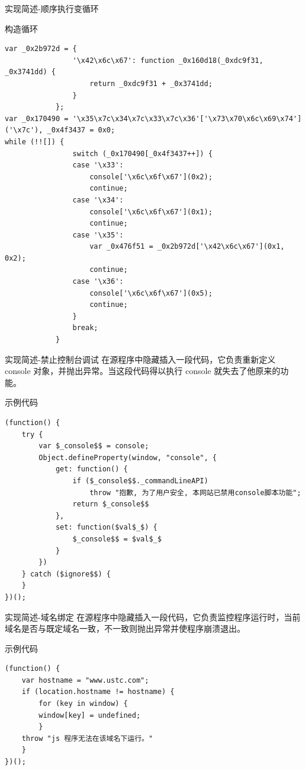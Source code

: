 \documentclass[presentation]{beamer}
\begin{document}
\begin{frame}[fragile,label=sec-17]{实现简述-顺序执行变循环}

\begin{block}{构造循环}
\begin{verbatim}
var _0x2b972d = {
                '\x42\x6c\x67': function _0x160d18(_0xdc9f31, _0x3741dd) {
                    return _0xdc9f31 + _0x3741dd;
                }
            };
var _0x170490 = '\x35\x7c\x34\x7c\x33\x7c\x36'['\x73\x70\x6c\x69\x74']('\x7c'), _0x4f3437 = 0x0;
while (!![]) {
                switch (_0x170490[_0x4f3437++]) {
                case '\x33':
                    console['\x6c\x6f\x67'](0x2);
                    continue;
                case '\x34':
                    console['\x6c\x6f\x67'](0x1);
                    continue;
                case '\x35':
                    var _0x476f51 = _0x2b972d['\x42\x6c\x67'](0x1, 0x2);
                    continue;
                case '\x36':
                    console['\x6c\x6f\x67'](0x5);
                    continue;
                }
                break;
            }
            \end{verbatim}
\end{block}
\end{frame}
\begin{frame}[fragile,label=sec-18]{实现简述-禁止控制台调试}
在源程序中隐藏插入一段代码，它负责重新定义 console 对象，并抛出异常。当这段代码得以执行 console 就失去了他原来的功能。
\begin{block}{示例代码}
\begin{verbatim}
(function() {  
    try {  
        var $_console$$ = console;  
        Object.defineProperty(window, "console", {  
            get: function() {  
                if ($_console$$._commandLineAPI)  
                    throw "抱歉, 为了用户安全, 本网站已禁用console脚本功能";  
                return $_console$$  
            },  
            set: function($val$_$) {  
                $_console$$ = $val$_$  
            }  
        })  
    } catch ($ignore$$) {  
    }  
})();  
\end{verbatim}
\end{block}
\end{frame}
\begin{frame}[fragile,label=sec-19]{实现简述-域名绑定}
在源程序中隐藏插入一段代码，它负责监控程序运行时，当前域名是否与既定域名一致，不一致则抛出异常并使程序崩溃退出。
\begin{block}{示例代码}
\begin{verbatim}
(function() {
    var hostname = "www.ustc.com";
    if (location.hostname != hostname) {
        for (key in window) {
        window[key] = undefined;
        }
    throw "js 程序无法在该域名下运行。"
    }
})();
\end{verbatim}
\end{block}
\end{frame}
\end{document}
